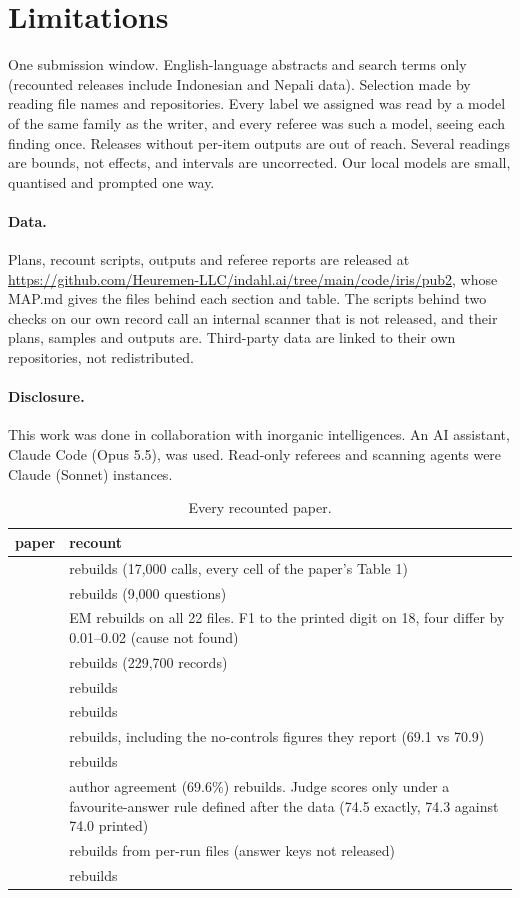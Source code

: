 \documentclass[11pt]{article}
\begin{document}
\section{Limitations}
One submission window. English-language abstracts and search terms only (recounted releases include Indonesian and Nepali
data). Selection made by reading file names and repositories. Every label we assigned was read by a model of the same
family as the writer, and every referee was such a model, seeing each finding once. Releases without per-item outputs are out of reach. Several
readings are bounds, not effects, and intervals are uncorrected. Our local models are small, quantised and prompted one way.

\paragraph{Data.} Plans, recount scripts, outputs and referee reports are released at
\url{https://github.com/Heuremen-LLC/indahl.ai/tree/main/code/iris/pub2}, whose MAP.md gives the files behind each section and table.
The scripts behind two checks on our own record call an internal scanner that is not released, and their plans, samples and outputs are.
Third-party data are linked to their own repositories, not redistributed.
\paragraph{Disclosure.} This work was done in collaboration with inorganic intelligences. An AI assistant, Claude Code (Opus 5.5), was used.
Read-only referees and scanning agents were Claude (Sonnet) instances.

\begin{table}[h]\centering\small
\begin{tabular}{lp{10cm}}\toprule
paper & recount \\\midrule
\citet{r2610_30512} & rebuilds (17,000 calls, every cell of the paper's Table 1) \\
\citet{r2610_25964} & rebuilds (9,000 questions) \\
\citet{r2610_31256} & EM rebuilds on all 22 files. F1 to the printed digit on 18, four differ by 0.01--0.02 (cause not found) \\
\citet{r2610_31135} & rebuilds (229,700 records) \\
\citet{r2610_25159} & rebuilds \\
\citet{r2610_15732} & rebuilds \\
\citet{r2610_18610} & rebuilds, including the no-controls figures they report (69.1 vs 70.9) \\
\citet{r2610_21468} & rebuilds \\
\citet{r2610_17203} & author agreement (69.6\%) rebuilds. Judge scores only under a favourite-answer rule defined after the data (74.5 exactly, 74.3 against 74.0 printed) \\
\citet{r2610_25626} & rebuilds from per-run files (answer keys not released) \\
\citet{r2610_24999} & rebuilds \\\bottomrule
\end{tabular}\caption{Every recounted paper.}\label{tab:book}\end{table}



\end{document}
